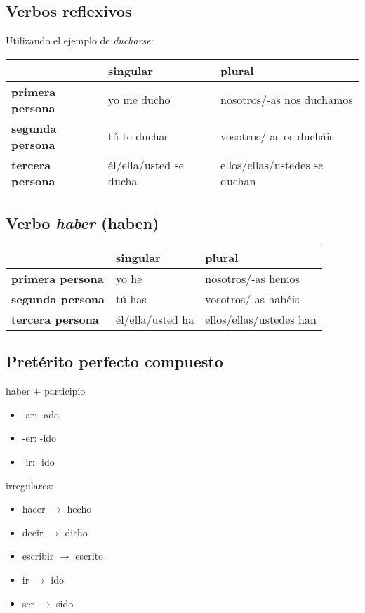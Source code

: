 \documentclass{article}
\begin{document}
	\subsection{Verbos reflexivos}\label{reflexivverben}
	
	Utilizando el ejemplo de \textit{ducharse}:
	\begin{center}
		\begin{tabular}{l|l|l}
			& \textbf{singular} & \textbf{plural} \\
			\hline
			\textbf{primera persona} & yo me ducho & nosotros/-as nos duchamos \\
			\hline
			\textbf{segunda persona} & tú te duchas & vosotros/-as os ducháis \\
			\hline
			\textbf{tercera persona} & él/ella/usted se ducha &ellos/ellas/ustedes se duchan
		\end{tabular}
	\end{center}

	\subsection{Verbo \textit{haber} (haben)}
	
	\begin{center}
		\begin{tabular}{l|l|l}
			& \textbf{singular} & \textbf{plural} \\
			\hline
			\textbf{primera persona} & yo he & nosotros/-as hemos \\
			\hline
			\textbf{segunda persona} & tú has & vosotros/-as habéis \\
			\hline
			\textbf{tercera persona} & él/ella/usted ha &ellos/ellas/ustedes han
		\end{tabular}
	\end{center}

	\subsection{Pretérito perfecto compuesto}
	
	haber + participio
	\begin{itemize}
		\item -ar: -ado
		\item -er: -ido
		\item -ir: -ido
	\end{itemize}

	irregulares:
	\begin{itemize}
		\item hacer $\to$ hecho
		\item decir $\to$ dicho
		\item escribir $\to$ escrito
		\item ir $\to$ ido
		\item ser $\to$ sido
	\end{itemize}
\end{document}
